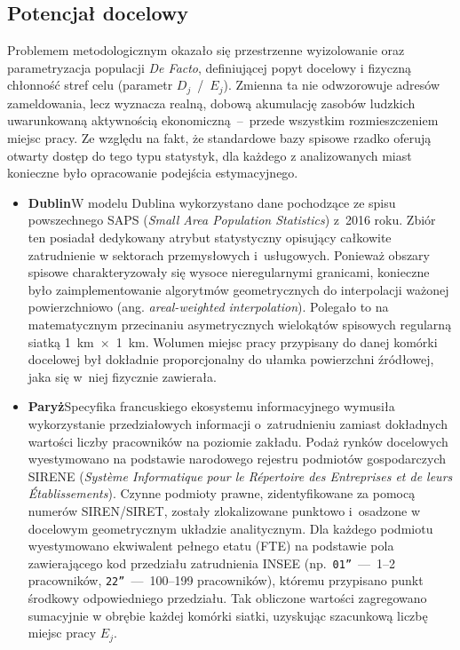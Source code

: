 \documentclass{pracamgr}
\begin{document}
\subsection{Potencjał docelowy}

Problemem metodologicznym okazało się przestrzenne wyizolowanie oraz parametryzacja populacji \textit{De Facto}, definiującej popyt docelowy i fizyczną chłonność stref celu (parametr \mbox{$D_j$ / $E_j$}). Zmienna ta nie odwzorowuje adresów zameldowania, lecz wyznacza realną, dobową akumulację zasobów ludzkich uwarunkowaną aktywnością ekonomiczną~–~przede wszystkim rozmieszczeniem miejsc pracy. Ze względu na fakt, że standardowe bazy spisowe rzadko oferują otwarty dostęp do tego typu statystyk, dla każdego z analizowanych miast konieczne było opracowanie podejścia estymacyjnego.

\begin{itemize}
\item[]\textbf{Dublin}\newline W modelu Dublina wykorzystano dane pochodzące ze spisu powszechnego SAPS (\textit{Small Area Population Statistics}) z~2016 roku. Zbiór ten posiadał dedykowany atrybut statystyczny opisujący całkowite zatrudnienie w sektorach przemysłowych i~usługowych. Ponieważ obszary spisowe charakteryzowały się wysoce nieregularnymi granicami, konieczne było zaimplementowanie algorytmów geometrycznych do interpolacji ważonej powierzchniowo (ang. \textit{areal-weighted interpolation}). Polegało to na matematycznym przecinaniu asymetrycznych wielokątów spisowych regularną siatką 1~km~$\times$~1~km. Wolumen miejsc pracy przypisany do danej komórki docelowej był dokładnie proporcjonalny do ułamka powierzchni źródłowej, jaka się w~niej fizycznie zawierała.
\item[]\textbf{Paryż}\newline Specyfika francuskiego ekosystemu informacyjnego wymusiła wykorzystanie przedziałowych informacji o~zatrudnieniu zamiast dokładnych wartości liczby pracowników na poziomie zakładu. Podaż rynków docelowych wyestymowano na podstawie narodowego rejestru podmiotów gospodarczych SIRENE (\textit{Système Informatique pour le Répertoire des Entreprises et de leurs Établissements}). Czynne podmioty prawne, zidentyfikowane za pomocą numerów SIREN/SIRET, zostały zlokalizowane punktowo i~osadzone w docelowym geometrycznym układzie analitycznym. Dla każdego podmiotu wyestymowano ekwiwalent pełnego etatu (FTE) na podstawie pola zawierającego kod przedziału zatrudnienia INSEE (np.\ \mbox{\texttt{01''} — 1--2} pracowników, \mbox{\texttt{22''} — 100--199} pracowników), któremu przypisano punkt środkowy odpowiedniego przedziału. Tak obliczone wartości zagregowano sumacyjnie w obrębie każdej komórki siatki, uzyskując szacunkową liczbę miejsc pracy $E_j$.

\end{itemize}
\end{document}
